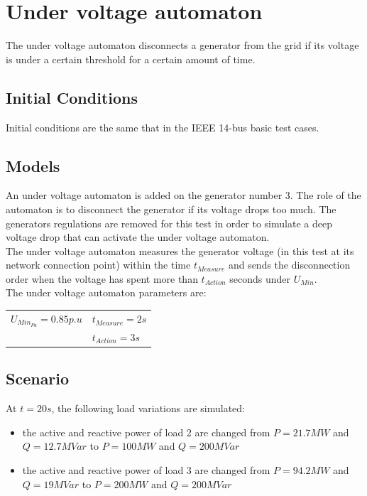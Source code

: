 \documentclass[a4paper, 12pt]{report}
\begin{document}
\newpage
\section{Under voltage automaton}
\label{UnderVoltageAutomaton}

The under voltage automaton disconnects a generator from the grid if its voltage is under a certain threshold for a certain amount of time.

\subsection{Initial Conditions}

Initial conditions are the same that in the IEEE 14-bus basic test cases.

\subsection{Models}

An under voltage automaton is added on the generator number 3. The role of the automaton is to disconnect the generator if its voltage drops too much. The generators regulations are removed for this test in order to simulate a deep voltage drop that can activate the under voltage automaton.\\

The under voltage automaton measures the generator voltage (in this test at its network connection point) within the time $t_{Measure}$ and sends the disconnection order when the voltage has spent more than $t_{Action}$ seconds under $U_{Min}$.\\

The under voltage automaton parameters are:
\begin{center}
\begin{tabular}{l|l}
   $U_{Min_{Pu}}=0.85p.u$ & $t_{Measure}=2s$  \\
    & $t_{Action}=3s$   \\
\end{tabular}
\end{center}

\subsection{Scenario}
At $t=20s$, the following load variations are simulated:
\begin{itemize}
\item{the active and reactive power of load 2 are changed from $P=21.7MW$ and $Q=12.7MVar$ to $P=100MW$ and $Q=200MVar$}
\item{the active and reactive power of load 3 are changed from $P=94.2MW$ and $Q=19MVar$ to $P=200MW$ and $Q=200MVar$}
\end{itemize}
\end{document}
